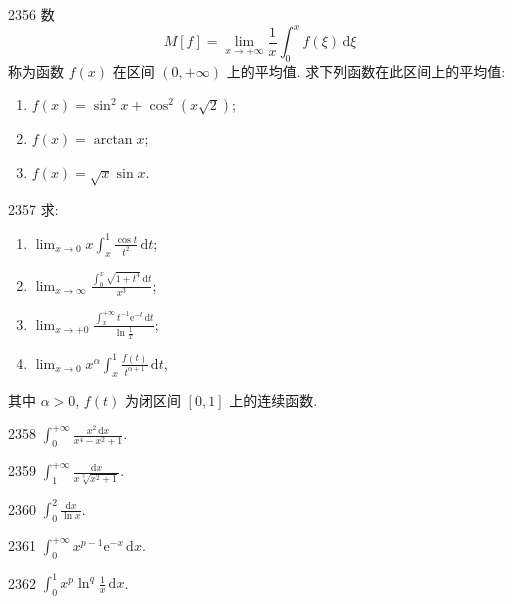 \begin{prob}[L]{2356}
数
\[
M[f] = \lim_{x \to +\infty} \frac{1}{x} \int_0^x f(\xi)\,\mathrm{d}\xi
\]
称为函数 $f(x)$ 在区间 $(0, +\infty)$ 上的平均值. 求下列函数在此区间上的平均值:
\begin{enumerate}[label=(\alph*), itemsep=2pt, topsep=3pt]
\item $f(x) = \sin^2 x + \cos^2(x\sqrt{2})$;
\item $f(x) = \arctan x$;
\item $f(x) = \sqrt{x} \sin x$.
\end{enumerate}
\end{prob}

\begin{prob}[L]{2357}
求:
\begin{enumerate}[label=(\alph*), itemsep=2pt, topsep=3pt]
\item $\displaystyle\lim_{x \to 0} x \int_x^1 \frac{\cos t}{t^2}\,\mathrm{d}t$;
\item $\displaystyle\lim_{x \to \infty} \frac{\int_0^x \sqrt{1 + t^4}\,\mathrm{d}t}{x^3}$;
\item $\displaystyle\lim_{x \to +0} \frac{\int_x^{+\infty} t^{-1} \mathrm{e}^{-t}\,\mathrm{d}t}{\ln \frac{1}{x}}$;
\item $\displaystyle\lim_{x \to 0} x^\alpha \int_x^1 \frac{f(t)}{t^{\alpha + 1}}\,\mathrm{d}t$,
\end{enumerate}
其中 $\alpha > 0$, $f(t)$ 为闭区间 $[0, 1]$ 上的连续函数.
\end{prob}


\begin{prob}[S]{2358}
$\displaystyle\int_0^{+\infty} \frac{x^2\,\mathrm{d}x}{x^4 - x^2 + 1}$.
\end{prob}

\begin{prob}[S]{2359}
$\displaystyle\int_1^{+\infty} \frac{\mathrm{d}x}{x \sqrt[3]{x^2 + 1}}$.
\end{prob}

\begin{prob}[S]{2360}
$\displaystyle\int_0^2 \frac{\mathrm{d}x}{\ln x}$.
\end{prob}

\begin{prob}[S]{2361}
$\displaystyle\int_0^{+\infty} x^{p - 1} \mathrm{e}^{-x}\,\mathrm{d}x$.
\end{prob}

\begin{prob}[S]{2362}
$\displaystyle\int_0^1 x^p \ln^q \frac{1}{x}\,\mathrm{d}x$.
\end{prob}

